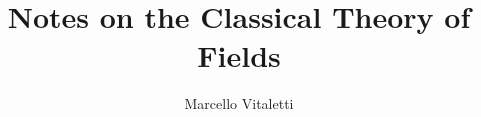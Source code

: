 \documentclass[english, 11pt]{book}
\begin{document}
\newcommand{\quotes}[1]{``#1''}
\newcommand{\sfT}{$\mathsf{T}$}
\newcommand{\udT}{\rotatebox[origin=c]{180}{$\mathsf{T}$}}
\newcommand{\N}{\mathbb{N}}
\newcommand{\Z}{\mathbb{Z}}
\newcommand{\Q}{\mathbb{Q}}
\newcommand{\R}{\mathbb{R}}
\newcommand{\C}{\mathbb{C}}

\newcommand{\ut}[1]{\underaccent{\tilde}{#1}}
\newcommand{\uh}[1]{\underaccent{\hat}{#1}}
\newcommand{\form}[1]{\uh{#1}}

\newcommand{\tit}[1]{\textit{#1}}
\newcommand{\tbf}[1]{\textbf{#1}}
\newcommand{\tbi}[1]{\textit{\textbf{#1}}}


\DeclareRobustCommand{\rchi}{{\mathpalette\irchi\relax}}
\newcommand{\irchi}[2]{\raisebox{\depth}{$#1\chi$}} %



\author{Marcello Vitaletti}
\title{Notes on the Classical Theory of Fields\\
{\small }}
\maketitle

\frontmatter%

%

%	
\tableofcontents

\mainmatter%


\end{document}
